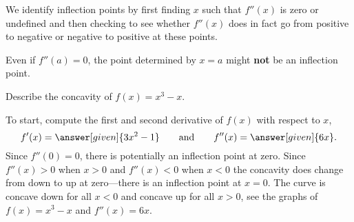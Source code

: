 \documentclass{ximera}
\begin{document}
We identify inflection points by first finding $x$ such that $f''(x)$
is zero or undefined and then checking to see whether $f''(x)$ does in
fact go from positive to negative or negative to positive at these
points.

\begin{warning}
Even if $f''(a) = 0$, the point determined by $x=a$ might \textbf{not}
be an inflection point.
\end{warning}


\begin{example}
Describe the concavity of $f(x)=x^3-x$. 

\begin{explanation}
To start, compute the first and second derivative of $f(x)$ with
respect to $x$,
\[
f'(x)=\answer[given]{3x^2-1}\qquad\text{and}\qquad f''(x)=\answer[given]{6x}.
\]
Since $f''(0)=0$, there is potentially an inflection point at
zero. Since $f''(x)>0$ when $x>0$ and $f''(x)<0$ when $x<0$ the
concavity does change from down to up at zero---there is an inflection
point at $x=0$. The curve is concave down for all $x<0$ and concave up
for all $x>0$, see the graphs of $f(x) = x^3-x$ and $f''(x) = 6x$.
\begin{image}
\end{image}
\end{explanation}
\end{example}
\end{document}
